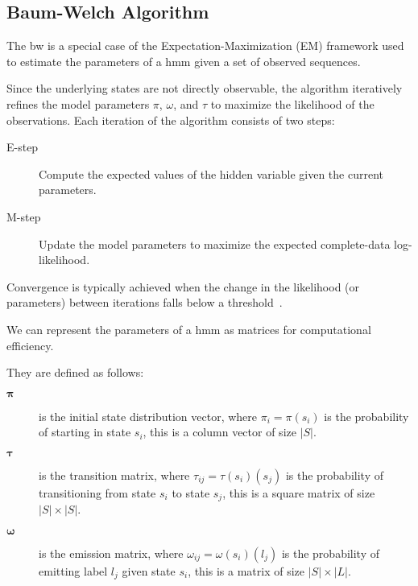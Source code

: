 
\subsection{Baum-Welch Algorithm}\label{subsec:baum-welch}
The \gls{bw} is a special case of the Expectation-Maximization (EM) framework used to estimate the parameters of a \gls{hmm} given a set of observed sequences.

Since the underlying states are not directly observable, the algorithm iteratively refines the model parameters $\pi$, $\omega$, and $\tau$ to maximize the likelihood of the observations.
Each iteration of the algorithm consists of two steps:


\begin{description}
    \item[E-step] Compute the expected values of the hidden variable given the current parameters.
    \item[M-step] Update the model parameters to maximize the expected complete-data log-likelihood.
\end{description}


Convergence is typically achieved when the change in the likelihood (or parameters) between iterations falls below a threshold~\cite{Rabiner89}.

We can represent the parameters of a \gls{hmm} as matrices for computational efficiency.

They are defined as follows:


\begin{description}
    \item[$\pmb{\pi}$] is the initial state distribution vector, where $\pi_i = \pi(s_i)$ is the probability of starting in state $s_i$, this is a column vector of size $|S|$.
    \item[$\pmb{\tau}$] is the transition matrix, where $\tau_{ij} = \tau(s_i)(s_j)$ is the probability of transitioning from state $s_i$ to state $s_j$, this is a square matrix of size $|S| \times |S|$.
    \item[$\pmb{\omega}$] is the emission matrix, where $\omega_{ij} = \omega(s_i)(l_j)$ is the probability of emitting label $l_j$ given state $s_i$, this is a matrix of size $|S| \times |L|$.
\end{description}



